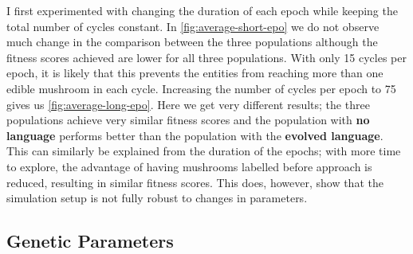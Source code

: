 \documentclass[12pt,a4paper]{report}
\begin{document}
I first experimented with changing the duration of each epoch while keeping the total number of cycles constant. In \cref{fig:average-short-epo} we do not observe much change in the comparison between the three populations although the fitness scores achieved are lower for all three populations. With only 15 cycles per epoch, it is likely that this prevents the entities from reaching more than one edible mushroom in each cycle. Increasing the number of cycles per epoch to 75 gives us \cref{fig:average-long-epo}. Here we get very different results; the three populations achieve very similar fitness scores and the population with {\bf no language} performs better than the population with the {\bf evolved language}. This can similarly be explained from the duration of the epochs; with more time to explore, the advantage of having mushrooms labelled before approach is reduced, resulting in similar fitness scores. This does, however, show that the simulation setup is not fully robust to changes in parameters.
 
 \subsection{Genetic Parameters}
 
\end{document}
